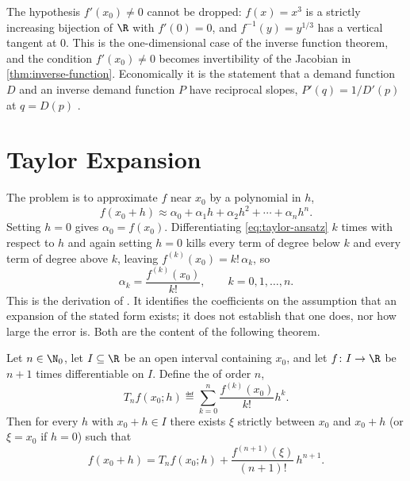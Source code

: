 The hypothesis $f'(x_0)\neq0$ cannot be dropped: $f(x)=x^3$ is a strictly
increasing bijection of $\R$ with $f'(0)=0$, and $f^{-1}(y)=y^{1/3}$ has a
vertical tangent at $0$. This is the one-dimensional case of the inverse function
theorem, and the condition $f'(x_0)\neq0$ becomes invertibility of the Jacobian
in \autoref{thm:inverse-function}. Economically it is the statement that a demand
function $D$ and an inverse demand function $P$ have reciprocal slopes,
$P'(q)=1/D'(p)$ at $q=D(p)$ \autocite[slides 19--20]{fukuda2026calculus}.

\section{Taylor Expansion}\label{sec:c1-taylor}

The problem is to approximate $f$ near $x_0$ by a polynomial in $h$,
\begin{equation}\label{eq:taylor-ansatz}
	f(x_0+h)\approx\alpha_0+\alpha_1h+\alpha_2h^2+\cdots+\alpha_nh^n .
\end{equation}
Setting $h=0$ gives $\alpha_0=f(x_0)$. Differentiating \eqref{eq:taylor-ansatz}
$k$ times with respect to $h$ and again setting $h=0$ kills every term of degree
below $k$ and every term of degree above $k$, leaving
$f^{(k)}(x_0)=k!\,\alpha_k$, so
\begin{equation}\label{eq:taylor-coefficients}
	\alpha_k=\frac{f^{(k)}(x_0)}{k!},\qquad k=0,1,\dots,n .
\end{equation}
This is the derivation of \autocite[slides 28--31]{fukuda2026calculus}. It
identifies the coefficients on the assumption that an expansion of the stated
form exists; it does not establish that one does, nor how large the error is.
Both are the content of the following theorem.

\begin{theorem}\label{thm:taylor-1d}
	Let $n\in\N_0$, let $I\subseteq\R$ be an open interval containing $x_0$, and let
	$f\colon I\to\R$ be $n+1$ times differentiable on $I$. Define the
	 of order $n$,
	\[
		T_nf(x_0;h)\eqdef\sum_{k=0}^{n}\frac{f^{(k)}(x_0)}{k!}h^k .
	\]
	Then for every $h$ with $x_0+h\in I$ there exists $\xi$ strictly between $x_0$
	and $x_0+h$ (or $\xi=x_0$ if $h=0$) such that
	\begin{equation}\label{eq:lagrange-remainder}
		f(x_0+h)=T_nf(x_0;h)+\frac{f^{(n+1)}(\xi)}{(n+1)!}\,h^{n+1}.
	\end{equation}
\end{theorem}

